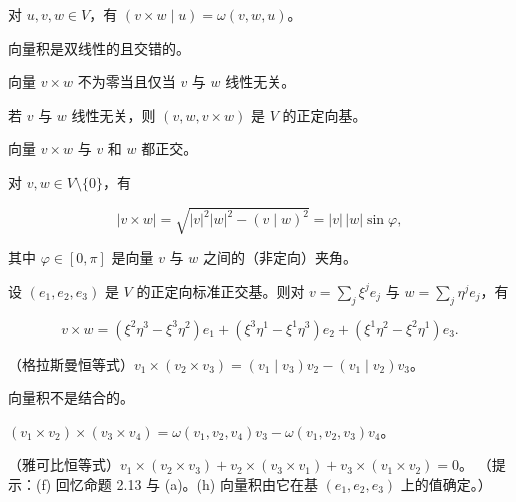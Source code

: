 \begin{exercises}
\begin{items}
对 $ u,v,w \in V $，有 $ (v\times w\mid u) = \omega(v,w,u) $。

\item

向量积是双线性的且交错的。

\item

向量 $ v\times w $ 不为零当且仅当 $ v $ 与 $ w $ 线性无关。

\item

若 $ v $ 与 $ w $ 线性无关，则 $ (v,w,v\times w) $ 是 $ V $ 的正定向基。

\item

向量 $ v\times w $ 与 $ v $ 和 $ w $ 都正交。

\item

对 $ v,w \in V\setminus\{0\} $，有

\[
|v\times w| = \sqrt{|v|^{2}|w|^{2} - (v\mid w)^{2}} = |v|\,|w|\sin\varphi,
\]

其中 $ \varphi \in [0,\pi] $ 是向量 $ v $ 与 $ w $ 之间的（非定向）夹角。

\item

设 $ (e_{1},e_{2},e_{3}) $ 是 $ V $ 的正定向标准正交基。则对 $ v = \sum_{j}\xi^{j}e_{j} $ 与 $ w = \sum_{j}\eta^{j}e_{j} $，有

\[
v\times w = (\xi^{2}\eta^{3} - \xi^{3}\eta^{2})e_{1} + (\xi^{3}\eta^{1} - \xi^{1}\eta^{3})e_{2} + (\xi^{1}\eta^{2} - \xi^{2}\eta^{1})e_{3}.
\]
\item

（格拉斯曼恒等式）$ v_{1}\times(v_{2}\times v_{3}) = (v_{1}\mid v_{3})v_{2} - (v_{1}\mid v_{2})v_{3} $。

\item

向量积不是结合的。

\item

$ (v_{1}\times v_{2})\times(v_{3}\times v_{4}) = \omega(v_{1},v_{2},v_{4})v_{3} - \omega(v_{1},v_{2},v_{3})v_{4} $。

\item

（雅可比恒等式）$ v_{1}\times(v_{2}\times v_{3}) + v_{2}\times(v_{3}\times v_{1}) + v_{3}\times(v_{1}\times v_{2}) = 0 $。
（提示：(f) 回忆命题 2.13 与 (a)。(h) 向量积由它在基 $ (e_{1},e_{2},e_{3}) $ 上的值确定。）

\end{items}


\end{exercises}
